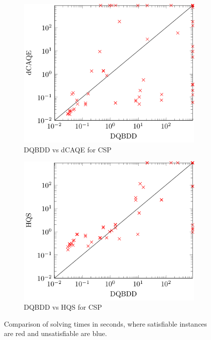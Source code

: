 \documentclass[
  digital, %
  color,
  twoside, %
  table,   %
  nolof,     %
  nolot,     %
]{fithesis3}
\theoremstyle{definition}
\theoremstyle{remark}
\begin{document}
\begin{figure}[p]
\begin{subfigure}{0.48\textwidth}
    \centering
    \includegraphics[width=\linewidth]{figures/CSPdqbddVSdcaqe.pdf}
    \caption{DQBDD vs dCAQE for CSP}
    \label{fig:CSPdqbddVSdcaqe}
  \end{subfigure}
  \begin{subfigure}{0.48\textwidth}
    \centering
    \includegraphics[width=\linewidth]{figures/CSPdqbddVShqs.pdf}
    \caption{DQBDD vs HQS for CSP}
    \label{fig:CSPdqbddVShqs}
  \end{subfigure}
  \caption{Comparison of solving times in seconds, where satisfiable instances are red and unsatisfiable are blue.}
  \label{fig:runtimecomp}
\end{figure}
\end{document}
